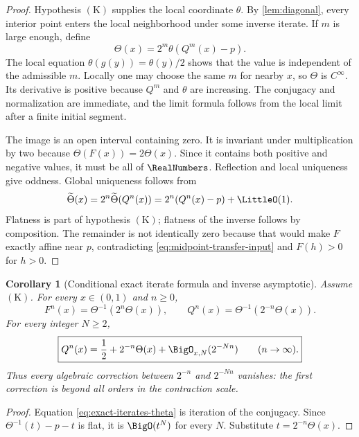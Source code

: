 \documentclass[11pt,oneside]{article}
\newtheorem{corollary}[theorem]{Corollary}
\theoremstyle{definition}
\theoremstyle{remark}
\begin{document}
\begin{proof}
Hypothesis \(\mathrm{(K)}\) supplies the local coordinate \(\theta\).  By
\cref{lem:diagonal}, every interior point enters the local neighborhood under
some inverse iterate.  If \(m\) is large enough, define
\begin{equation}
 \Theta(x)=2^m\theta(Q^m(x)-p).
 \label{eq:theta-globalize}
\end{equation}
The local equation \(\theta(g(y))=\theta(y)/2\) shows that the value is independent of the
admissible \(m\).  Locally one may choose the same \(m\) for nearby \(x\), so \(\Theta\) is
\(C^\infty\).  Its derivative is positive because \(Q^m\) and \(\theta\) are increasing.
The conjugacy and normalization are immediate, and the limit formula follows from the local
limit after a finite initial segment.

The image is an open interval containing zero.  It is invariant under multiplication by two
because \(\Theta(F(x))=2\Theta(x)\).  Since it contains both positive and negative values, it
must be all of \(\RealNumbers\).  Reflection and local uniqueness give oddness.  Global uniqueness
follows from
\[
 \widetilde\Theta(x)
 =2^n\widetilde\Theta(Q^n(x))
 =2^n(Q^n(x)-p)+\LittleO(1).
\]
Flatness is part of hypothesis \(\mathrm{(K)}\); flatness of the inverse follows
by composition.  The remainder is not identically zero because that would make \(F\) exactly
affine near \(p\), contradicting \eqref{eq:midpoint-transfer-input} and \(F(h)>0\) for
\(h>0\).
\end{proof}

\begin{corollary}[Conditional exact iterate formula and inverse asymptotic]
\label{cor:iterate-formula}
Assume \(\mathrm{(K)}\).  For every \(x\in(0,1)\) and \(n\ge0\),
\begin{equation}
 F^n(x)=\Theta^{-1}(2^n\Theta(x)),
 \qquad
 Q^n(x)=\Theta^{-1}(2^{-n}\Theta(x)).
 \label{eq:exact-iterates-theta}
\end{equation}
For every integer \(N\ge2\),
\begin{equation}
 \boxed{\displaystyle
 Q^n(x)=\frac12+2^{-n}\Theta(x)+\BigO_{x,N}(2^{-Nn})
 \qquad(n\to\infty).}
 \label{eq:inverse-beyond-all-orders}
\end{equation}
Thus every algebraic correction between \(2^{-n}\) and \(2^{-Nn}\) vanishes: the first
correction is beyond all orders in the contraction scale.
\end{corollary}

\begin{proof}
Equation \eqref{eq:exact-iterates-theta} is iteration of the conjugacy.  Since
\(\Theta^{-1}(t)-p-t\) is flat, it is \(\BigO(t^N)\) for every \(N\).  Substitute
\(t=2^{-n}\Theta(x)\).
\end{proof}
\end{document}

